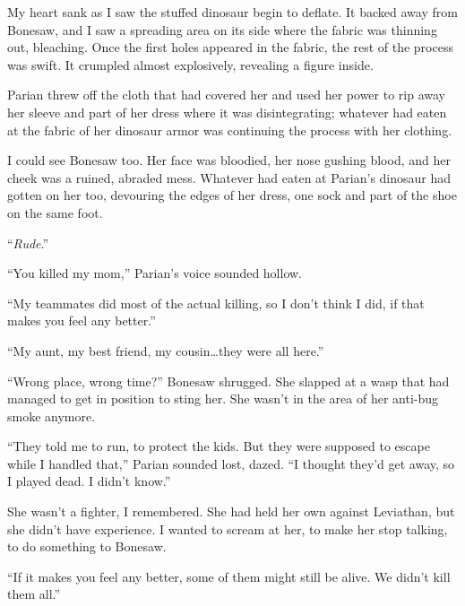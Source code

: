 My heart sank as I saw the stuffed dinosaur begin to deflate.  It backed away from Bonesaw, and I saw a spreading area on its side where the fabric was thinning out, bleaching.  Once the first holes appeared in the fabric, the rest of the process was swift.  It crumpled almost explosively, revealing a figure inside.



Parian threw off the cloth that had covered her and used her power to rip away her sleeve and part of her dress where it was disintegrating; whatever had eaten at the fabric of her dinosaur armor was continuing the process with her clothing.



I could see Bonesaw too.  Her face was bloodied, her nose gushing blood, and her cheek was a ruined, abraded mess.  Whatever had eaten at Parian's dinosaur had gotten on her too, devouring the edges of her dress, one sock and part of the shoe on the same foot.



``\emph{Rude}.''



``You killed my mom,'' Parian's voice sounded hollow.



``My teammates did most of the actual killing, so I don't think I did, if that makes you feel any better.''



``My aunt, my best friend, my cousin\ldots they were all here.''



``Wrong place, wrong time?'' Bonesaw shrugged.  She slapped at a wasp that had managed to get in position to sting her.  She wasn't in the area of her anti-bug smoke anymore.



``They told me to run, to protect the kids.  But they were supposed to escape while I handled that,'' Parian sounded lost, dazed.  ``I thought they'd get away, so I played dead.  I didn't know.''



She wasn't a fighter, I remembered.  She had held her own against Leviathan, but she didn't have experience.  I wanted to scream at her, to make her stop talking, to do something to Bonesaw.



``If it makes you feel any better, some of them might still be alive.  We didn't kill them all.''



